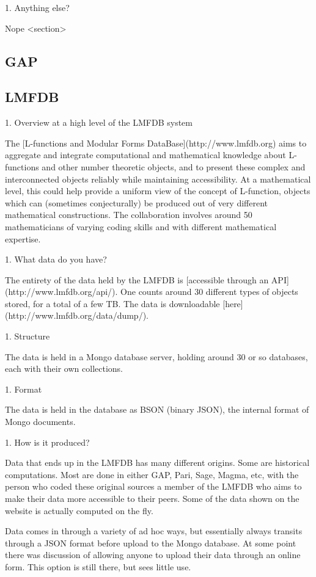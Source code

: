 \documentclass{deliverablereport}
\begin{document}
1. Anything else?

Nope
<section>

\subsection{GAP}

\subsection{LMFDB}

1. Overview at a high level of the LMFDB system

 The [L-functions and Modular Forms DataBase](http://www.lmfdb.org) aims to aggregate and integrate computational and mathematical knowledge about L-functions and other number theoretic objects, and to present these complex and interconnected objects reliably while maintaining accessibility. At a mathematical level, this could help provide a uniform view of the concept of L-function, objects which can (sometimes conjecturally) be produced out of very different mathematical constructions. The collaboration involves around 50 mathematicians of varying coding skills and with different mathematical expertise.

1. What data do you have?

 The entirety of the data held by the LMFDB is [accessible through an API](http://www.lmfdb.org/api/). One counts around 30 different types of objects stored, for a total of a few TB. The data is downloadable  [here](http://www.lmfdb.org/data/dump/).

 1. Structure

   The data is held in a Mongo database server, holding around 30 or so databases, each with their own collections.

 1. Format

   The data is held in the database as BSON (binary JSON), the internal format of Mongo documents.

 1. How is it produced?

   Data that ends up in the LMFDB has many different origins. Some are historical computations. Most are done in either GAP, Pari, Sage, Magma, etc, with the person who coded these original sources a member of the LMFDB who aims to make their data more accessible to their peers. Some of the data shown on the website is actually computed on the fly.

    Data comes in through a variety of ad hoc ways, but essentially always transits through a JSON format before upload to the Mongo database. At some point there was discussion of allowing anyone to upload their data through an online form. This option is still there, but sees little use.
\end{document}
